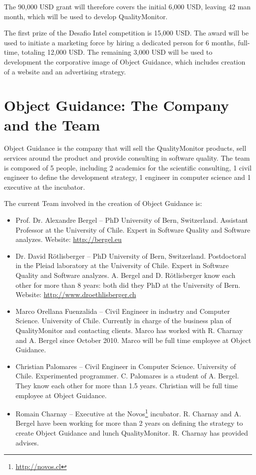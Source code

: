 \documentclass[runningheads]{llncs}
\newcommand{\seclabel}[1]{\label{sec:#1}}
\begin{document}
The 90,000 USD grant will therefore covers the initial 6,000 USD, leaving 42 man month, which will be used to develop QualityMonitor. 

The first prize of the Desafio Intel competition is 15,000 USD. The award will be used to initiate a marketing force by hiring a dedicated person for 6 months, full-time, totaling 12,000 USD. The remaining 3,000 USD will be used to development the corporative image of Object Guidance, which includes creation of a website and an advertising strategy.

\section{Object Guidance: The Company and the Team} \seclabel{team}

Object Guidance is the company that will sell the QualityMonitor products, sell services around the product and provide consulting in software quality. The team is composed of 5 people, including 2 academics for the scientific consulting, 1 civil engineer to define the development strategy, 1 engineer in computer science and 1 executive at the incubator.

The current Team involved in the creation of Object Guidance is:
\begin{itemize}
\item Prof. Dr. Alexandre Bergel -- PhD University of Bern, Switzerland. Assistant Professor at the University of Chile. Expert in Software Quality and Software analyzes. Website: \url{http://bergel.eu}
\item Dr. David R\"otlisberger -- PhD University of Bern, Switzerland. Postdoctoral in the Pleiad laboratory at the University of Chile. Expert in Software Quality and Software analyzes. A. Bergel and D. R\"otlisberger know each other for more than 8 years: both did they PhD at the University of Bern. Website: \url{http://www.droethlisberger.ch}
\item Marco Orellana Fuenzalida -- Civil Engineer in industry and Computer Science. University of Chile. Currently in charge of the business plan of QualityMonitor and contacting clients. Marco has worked with R. Charnay and A. Bergel since October 2010. Marco will be full time employee at Object Guidance.
\item Christian Palomares -- Civil Engineer in Computer Science. University of Chile. Experimented programmer. C. Palomares is a student of A. Bergel. They know each other for more than 1.5 years. Christian will be full time employee at Object Guidance.
\item Romain Charnay -- Executive at the Novos\footnote{\url{http://novos.cl}} incubator. R. Charnay and A. Bergel have been working for more than 2 years on defining the strategy to create Object Guidance and lunch QualityMonitor. R. Charnay has provided advises.
\end{itemize}
\end{document}
